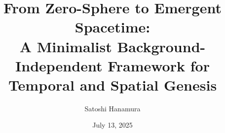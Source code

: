 \documentclass[%
 reprint,
 amsmath,amssymb,
 aps,
]{revtex4-1}
\numberwithin{equation}{section}%
\begin{document}


\title{From Zero-Sphere to Emergent Spacetime:\\ A Minimalist Background-Independent Framework for Temporal and Spatial Genesis}
\author{Satoshi Hanamura}
\date{July 13, 2025}




\end{document}
